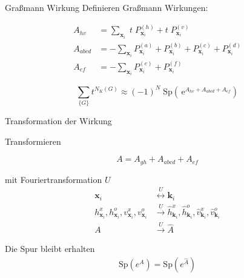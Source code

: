 \documentclass[11pt]{beamer}
\newcommand{\Sp}[1]{\mathrm{Sp}\left( #1 \right)}
\begin{document}
    \begin{frame}{Graßmann Wirkung}
    Definieren Graßmann Wirkungen:
    
    \begin{equation} \nonumber
    \begin{aligned}
        A_{hv} &= \sum_{\bm{x}_i} 
            \; t \; P_{\bm{x}_i}^{(h)}
            + t \; P_{\bm{x}_i}^{(v)} \\
        A_{abcd} &= - \sum_{\bm{x}_i }  
               P_{\bm{x}_i}^{(a)}  
            +  P_{\bm{x}_i}^{(b)}
            +  P_{\bm{x}_i}^{(c)} 
            +  P_{\bm{x}_i}^{(d)} \\
        A_{ef} &= - \sum_{\bm{x}_i } 
             P_{\bm{x}_i}^{(e)}
            +  P_{\bm{x}_i}^{(f)}
    \end{aligned}
    \end{equation}
    

    
   \pause
    \begin{grayframe}[frametitle = {Zustandssumme mit Graßmann Variablen}]
    \begin{equation} \nonumber
    \sum_{\{ G\}} t^{N_K(G)} \approx (-1)^N\; \Sp{ \,\mathrm{e}^{A_{hv} + A_{abcd} + A_{ef}}}
    \end{equation}
    \end{grayframe}
    
    \end{frame}
    
        \begin{frame}{Transformation der Wirkung}
    
    Transformieren
    
    \begin{equation} \nonumber
     A = A_{gh} + A_{abcd} + A_{ef} 
    \end{equation}
    
    mit Fouriertransformation  $U$
        \begin{align} \nonumber
            \bm{x}_i &\overset{U}{\longleftrightarrow} \bm{k}_i \\ \nonumber
            h_{\bm{x}_i}^x, h_{\bm{x}_i}^o, v_{\bm{x}_i}^x, v_{\bm{x}_i}^o &\overset{U}{\longrightarrow} \hat h_{\bm{k}_i}^x, \hat h_{\bm{k}_i}^o, \hat v_{\bm{k}_i}^x, \hat v_{\bm{k}_i}^o \\ \nonumber
           A &\overset{U}{\longrightarrow} \hat A
        \end{align}
    
    Die Spur bleibt erhalten
        \begin{align} \nonumber
            \Sp{e^A} = \Sp{e^{\hat{A}}}
        \end{align}

    \end{frame}
    
\end{document}
